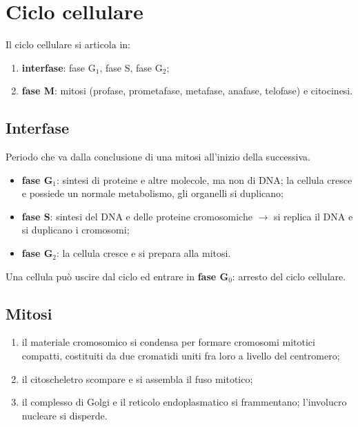 \section{Ciclo cellulare}

Il ciclo cellulare si articola in:
\begin{enumerate}
  \item \textbf{interfase}: fase G$_1$, fase S, fase G$_2$;
  \item \textbf{fase M}: mitosi (profase, prometafase, metafase, anafase, telofase) e citocinesi.
\end{enumerate}

\subsection{Interfase}

Periodo che va dalla conclusione di una mitosi all'inizio della successiva.
\begin{itemize}
  \item \textbf{fase G$_1$}: sintesi di proteine e altre molecole, ma non di DNA; la cellula cresce e possiede un normale metabolismo, gli organelli si duplicano;
  \item \textbf{fase S}: sintesi del DNA e delle proteine cromosomiche $\rightarrow$ si replica il DNA e si duplicano i cromosomi;
  \item \textbf{fase G$_2$}: la cellula cresce e si prepara alla mitosi.
\end{itemize}
Una cellula può uscire dal ciclo ed entrare in \textbf{fase G$_0$}: arresto del ciclo cellulare.

\subsection{Mitosi}

\begin{enumerate}
  \item il materiale cromosomico si condensa per formare cromosomi mitotici compatti, costituiti da due cromatidi uniti fra loro a livello del centromero;
  \item il citoscheletro scompare e si assembla il fuso mitotico;
  \item il complesso di Golgi e il reticolo endoplasmatico si frammentano; l'involucro nucleare si disperde.
\end{enumerate}

